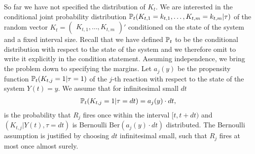 So far we have not specified the distribution of $K_t$. We are interested in the conditional joint probability distribution $\mathbb{P}_t(K_{t,1} = k_{t,1}, \dots, K_{t,m} = k_{t,m}|\tau)$ of the random vector $K_t = \begin{pmatrix}
K_{t,1}, \dots, K_{t,m} \end{pmatrix}'$ conditioned on the state of the system and a fixed interval size. Recall that we have defined $\mathbb{P}_t$ to be the conditional distribution with respect to the state of the system and we therefore omit to write it explicitly in the condition statement. Assuming independence, we bring the problem down to specifying the margins. Let $a_j(y)$ be the propensity function $\mathbb{P}_t(K_{t,j}=1|\tau=1)$ of the $j$-th reaction with respect to the state of the system $Y(t)=y$. We assume that for infinitesimal small $dt$
\begin{align}
\mathbb{P}_t(K_{t,j} = 1|\tau = dt) = a_j(y) \cdot dt,
\end{align}
is the probability that $R_j$ fires once within the interval $[t, t+dt)$ and $\left(K_{t,j}|Y(t), \tau =dt \right)$ is Bernoulli $\mathrm{Ber}(a_j(y) \cdot dt)$ distributed. The Bernoulli assumption is justified by choosing $dt$ infinitesimal small, such that $R_j$ fires at most once almost surely.

